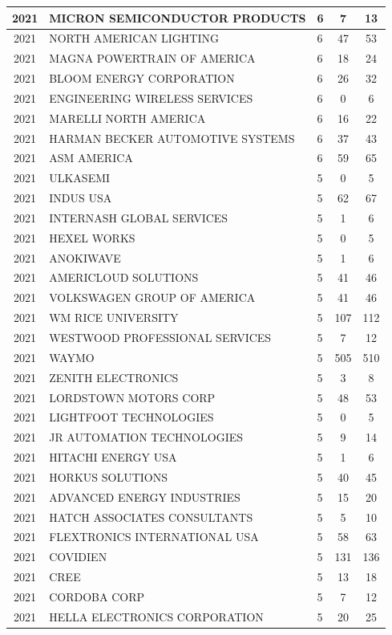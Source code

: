 \documentclass{article}%
\begin{document}
\begin{longtable}{c|p{20em}|p{5em}|c|c}
\hline%
2021&MICRON SEMICONDUCTOR PRODUCTS&6&7&13\\%
\hline%
2021&NORTH AMERICAN LIGHTING&6&47&53\\%
\hline%
2021&MAGNA POWERTRAIN OF AMERICA&6&18&24\\%
\hline%
2021&BLOOM ENERGY CORPORATION&6&26&32\\%
\hline%
2021&ENGINEERING WIRELESS SERVICES&6&0&6\\%
\hline%
2021&MARELLI NORTH AMERICA&6&16&22\\%
\hline%
2021&HARMAN BECKER AUTOMOTIVE SYSTEMS&6&37&43\\%
\hline%
2021&ASM AMERICA&6&59&65\\%
\hline%
2021&ULKASEMI&5&0&5\\%
\hline%
2021&INDUS USA&5&62&67\\%
\hline%
2021&INTERNASH GLOBAL SERVICES&5&1&6\\%
\hline%
2021&HEXEL WORKS&5&0&5\\%
\hline%
2021&ANOKIWAVE&5&1&6\\%
\hline%
2021&AMERICLOUD SOLUTIONS&5&41&46\\%
\hline%
2021&VOLKSWAGEN GROUP OF AMERICA&5&41&46\\%
\hline%
2021&WM RICE UNIVERSITY&5&107&112\\%
\hline%
2021&WESTWOOD PROFESSIONAL SERVICES&5&7&12\\%
\hline%
2021&WAYMO&5&505&510\\%
\hline%
2021&ZENITH ELECTRONICS&5&3&8\\%
\hline%
2021&LORDSTOWN MOTORS CORP&5&48&53\\%
\hline%
2021&LIGHTFOOT TECHNOLOGIES&5&0&5\\%
\hline%
2021&JR AUTOMATION TECHNOLOGIES&5&9&14\\%
\hline%
2021&HITACHI ENERGY USA&5&1&6\\%
\hline%
2021&HORKUS SOLUTIONS&5&40&45\\%
\hline%
2021&ADVANCED ENERGY INDUSTRIES&5&15&20\\%
\hline%
2021&HATCH ASSOCIATES CONSULTANTS&5&5&10\\%
\hline%
2021&FLEXTRONICS INTERNATIONAL USA&5&58&63\\%
\hline%
2021&COVIDIEN&5&131&136\\%
\hline%
2021&CREE&5&13&18\\%
\hline%
2021&CORDOBA CORP&5&7&12\\%
\hline%
2021&HELLA ELECTRONICS CORPORATION&5&20&25\\%

\end{longtable}
\end{document}
